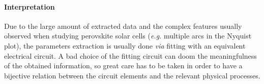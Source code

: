 	\paragraph{Interpretation}
	Due to the large amount of extracted data and the complex features usually observed when studying perovskite solar cells (\textsl{e.g.} multiple arcs in the Nyquist plot), the parameters extraction is usually done \textsl{via} fitting with an equivalent electrical circuit.
	A bad choice of the fitting circuit can doom the meaningfulness of the obtained information, so great care has to be taken in order to have a bijective relation between the circuit elements and the relevant physical processes.









